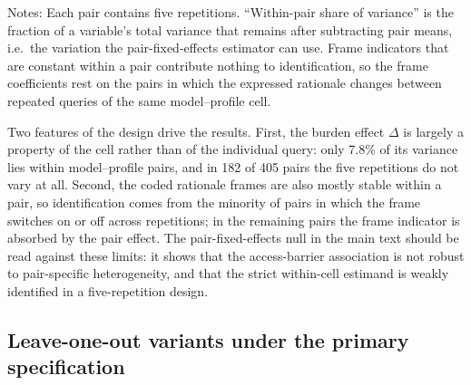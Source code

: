 \begin{table}[htbp]
\centering
\caption{Within-pair variation available to the pair-fixed-effects specification}
\label{tab:h2_within_pair}
\begin{flushleft}
\footnotesize Notes: Each pair contains five repetitions. ``Within-pair share of variance'' is the fraction of a variable's total variance that remains after subtracting pair means, i.e.\ the variation the pair-fixed-effects estimator can use. Frame indicators that are constant within a pair contribute nothing to identification, so the frame coefficients rest on the pairs in which the expressed rationale changes between repeated queries of the same model--profile cell.
\end{flushleft}
\end{table}

Two features of the design drive the results. First, the burden effect \(\Delta\) is largely a property of the cell rather than of the individual query: only 7.8\% of its variance lies within model--profile pairs, and in 182 of 405 pairs the five repetitions do not vary at all. Second, the coded rationale frames are also mostly stable within a pair, so identification comes from the minority of pairs in which the frame switches on or off across repetitions; in the remaining pairs the frame indicator is absorbed by the pair effect. The pair-fixed-effects null in the main text should be read against these limits: it shows that the access-barrier association is not robust to pair-specific heterogeneity, and that the strict within-cell estimand is weakly identified in a five-repetition design.

\subsection*{Leave-one-out variants under the primary specification}

